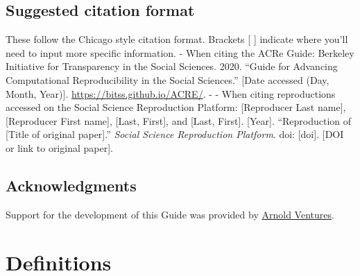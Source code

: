 \documentclass[
]{book}
\begin{document}
\hypertarget{suggested-citation-format}{%
\section{Suggested citation format}\label{suggested-citation-format}}

These follow the Chicago style citation format. Brackets {[} {]} indicate where you'll need to input more specific information.
- When citing the ACRe Guide: Berkeley Initiative for Transparency in the Social Sciences. 2020. ``Guide for Advancing Computational Reproducibility in the Social Sciences.'' {[}Date accessed (Day, Month, Year){]}. \url{https://bitss.github.io/ACRE/}.
- - When citing reproductions accessed on the Social Science Reproduction Platform: {[}Reproducer Last name{]}, {[}Reproducer First name{]}, {[}Last, First{]}, and {[}Last, First{]}. {[}Year{]}. ``Reproduction of {[}Title of original paper{]}.'' \emph{Social Science Reproduction Platform}. doi: {[}doi{]}. {[}DOI or link to original paper{]}.

\hypertarget{acknowledgments}{%
\section{Acknowledgments}\label{acknowledgments}}

Support for the development of this Guide was provided by \href{https://www.arnoldventures.org/}{Arnold Ventures}.

\hypertarget{definitions}{%
\chapter{Definitions}\label{definitions}}
\end{document}
